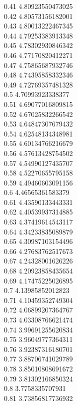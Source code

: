 {0.41	4.80923550473025\\
0.42	4.80573156182001\\
0.43	4.80013222467345\\
0.44	4.79253383913348\\
0.45	4.78302930846342\\
0.46	4.77170820412271\\
0.47	4.75865687932746\\
0.48	4.74395858332346\\
0.49	4.72769357481328\\
0.5	4.70993923338377\\
0.51	4.69077016809815\\
0.52	4.67025832266542\\
0.53	4.64847307679432\\
0.54	4.62548134348981\\
0.55	4.60134766216679\\
0.56	4.57613428754502\\
0.57	4.54990127435707\\
0.58	4.52270655795158\\
0.59	4.49460603091156\\
0.6	4.46565361583379\\
0.61	4.43590133443331\\
0.62	4.40539937314885\\
0.63	4.37419614543117\\
0.64	4.34233835089879\\
0.65	4.30987103154496\\
0.66	4.27683762517673\\
0.67	4.24328001626226\\
0.68	4.20923858435654\\
0.69	4.17475225026895\\
0.7	4.13985852012823\\
0.71	4.10459352749304\\
0.72	4.06899207364767\\
0.73	4.03308766621474\\
0.74	3.99691255620834\\
0.75	3.96049777364311\\
0.76	3.92387316180701\\
0.77	3.88706741029789\\
0.78	3.85010808691672\\
0.79	3.81302166850324\\
0.8	3.7758335707931\\
0.81	3.73856817736932\\
}
